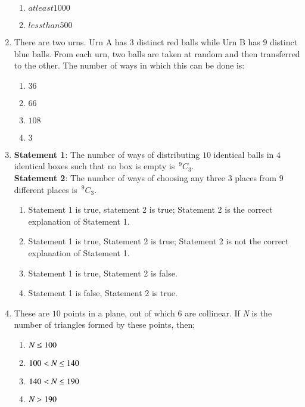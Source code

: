 \documentclass[journal,12pt,twocolumn]{IEEEtran}
\newcommand{\nCr}[2]{\,^{#1}C_{#2}}
\theoremstyle{remark}
\begin{document}
\begin{enumerate}
\begin{enumerate}
     \item $at least 1000$
     \item $less than 500$
 \end{enumerate}
\item There are two urns. Urn A has $3$ distinct red balls while Urn B has $9$ distinct blue balls. From each urn, two balls are taken at random and then transferred to the other. The number of ways in which this can be done is: \hfill{}
	\begin{multicols}{4}
	\begin{enumerate}
     \item $36$
     \item $66$
     \item $108$
     \item $3$
        \end{enumerate}
	\end{multicols}
\item \textbf{Statement 1}: The number of ways of distributing $10$ identical balls in $4$ identical boxes such that no box is empty is $\nCr{9}{3}$.\\\textbf{Statement 2}: The number of ways of choosing any three $3$ places from $9$ different places is $\nCr{9}{3}$. \hfill{}
 \begin{enumerate}
     \item Statement 1 is true, statement 2 is true; Statement 2 is the correct explanation of Statement 1.
     \item Statement 1 is true, Statement 2 is true; Statement 2 is not the correct explanation of Statement 1.
     \item Statement 1 is true, Statement 2 is false.
     \item Statement 1 is false, Statement 2 is true.
 \end{enumerate}
\item These are $10$ points in a plane, out of which 6 are collinear. If \emph{N} is the number of triangles formed by these points, then; \hfill{}
	\begin{multicols}{2}
	\begin{enumerate}
		\item $ \emph{N} \le100$
		\item $100< \emph{N} \le140$
		\item $140< \emph{N} \le190$
		\item $ \emph{N} >190$
        \end{enumerate}
	\end{multicols}

\end{enumerate}
\end{document}
